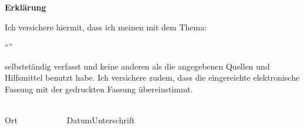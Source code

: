 

\thispagestyle{empty}
\begin{framed}
	\begin{center}
		\Large\bfseries Erklärung
	\end{center}

	\medskip
	\noindent
	Ich versichere hiermit, dass ich meinen \BerichtArt{} mit
	dem Thema:\\ 
	\begin{center}
	\enquote{\Titel}\\
	\end{center}
	selbstständig verfasst und keine anderen als die angegebenen Quellen und
	Hilfsmittel benutzt habe. Ich versichere zudem, dass die eingereichte elektronische Fassung mit der
	gedruckten Fassung übereinstimmt.
	
	\vspace{3cm}
	\noindent
	\underline{\hspace{6cm}}\hfill\underline{\hspace{6cm}}\\
	Ort~~~~~~~~~~~~Datum\hfill Unterschrift\hspace{4cm}
\end{framed}


\endinput
